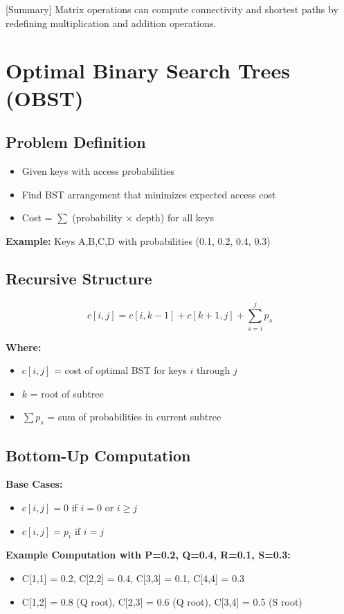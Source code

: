 \documentclass[12pt]{article}
\begin{document}
[Summary] Matrix operations can compute connectivity and shortest paths by redefining multiplication and addition operations.

\section{Optimal Binary Search Trees (OBST)}

\subsection{Problem Definition}

\begin{itemize}
    \item Given keys with access probabilities
    \item Find BST arrangement that minimizes expected access cost
    \item Cost = $\sum$ (probability × depth) for all keys
\end{itemize}

\textbf{Example:} Keys A,B,C,D with probabilities (0.1, 0.2, 0.4, 0.3)

\subsection{Recursive Structure}

\[
    c[i,j] = c[i,k-1] + c[k+1,j] + \sum_{s=i}^{j} p_s
\]

\textbf{Where:}
\begin{itemize}
    \item $c[i,j]$ = cost of optimal BST for keys $i$ through $j$
    \item $k$ = root of subtree
    \item $\sum p_s$ = sum of probabilities in current subtree
\end{itemize}

\subsection{Bottom-Up Computation}

\textbf{Base Cases:}
\begin{itemize}
    \item $c[i,j] = 0$ if $i = 0$ or $i \geq j$
    \item $c[i,j] = p_i$ if $i = j$
\end{itemize}

\textbf{Example Computation with P=0.2, Q=0.4, R=0.1, S=0.3:}
\begin{itemize}
    \item C[1,1] = 0.2, C[2,2] = 0.4, C[3,3] = 0.1, C[4,4] = 0.3
    \item C[1,2] = 0.8 (Q root), C[2,3] = 0.6 (Q root), C[3,4] = 0.5 (S root)
\end{itemize}
\end{document}
